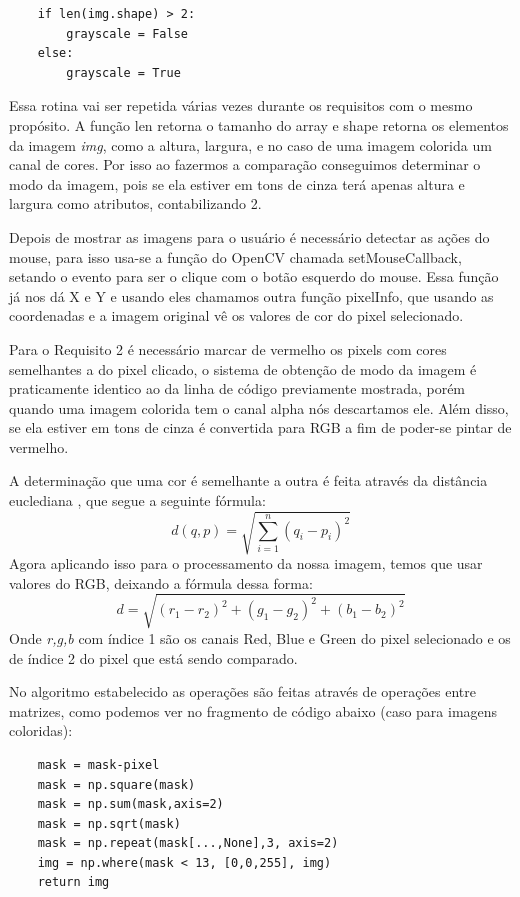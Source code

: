 \documentclass{bmvc2k}
\begin{document}
\begin{verbatim}
    if len(img.shape) > 2:
        grayscale = False
    else:
        grayscale = True
\end{verbatim}

Essa rotina vai ser repetida várias vezes durante os requisitos com o mesmo 
propósito. A função len retorna o tamanho do array e shape retorna os 
elementos da imagem {\em img}, como a altura, largura, e no caso de uma imagem colorida
um canal de cores. Por isso ao fazermos a comparação conseguimos determinar o modo da 
imagem, pois se ela estiver em tons de cinza terá apenas altura e largura como atributos, 
contabilizando 2.

\pagebreak

Depois de mostrar as imagens para o usuário é necessário detectar as ações do mouse, para isso
usa-se a função do OpenCV chamada setMouseCallback, setando o evento para ser o clique com o botão
esquerdo do mouse. Essa função já nos dá X e Y e usando eles chamamos outra função pixelInfo, que 
usando as coordenadas e a imagem original vê os valores de cor do pixel selecionado.

Para o Requisito 2 é necessário marcar de vermelho os pixels com cores semelhantes a do pixel clicado,
o sistema de obtenção de modo da imagem é praticamente identico ao da linha de código previamente mostrada,
porém quando uma imagem colorida tem o canal alpha nós descartamos ele. Além disso, se ela estiver em tons
de cinza é convertida para RGB a fim de poder-se pintar de vermelho.

A determinação que uma cor é semelhante a outra é feita através da distância euclediana \cite{Pbarrett}, que segue a
seguinte fórmula:
\begin{equation}
    d(q,p) = \sqrt{\sum_{i=1}^{n}(q_i - p_i)^2}
\end{equation}
Agora aplicando isso para o processamento da nossa imagem, temos que usar valores do RGB, deixando a fórmula
dessa forma:
\begin{equation}
    d = \sqrt{(r_1 - r_2)^2+(g_1 - g_2)^2+(b_1 - b_2)^2}
\end{equation}
Onde {\em r,g,b} com índice 1 são os canais Red, Blue e Green do pixel selecionado e os de índice 2 
do pixel que está sendo comparado.

No algoritmo estabelecido as operações são feitas através de operações entre 
matrizes, como podemos ver no fragmento de código abaixo (caso para imagens coloridas):
\begin{verbatim}
    mask = mask-pixel
    mask = np.square(mask)
    mask = np.sum(mask,axis=2)
    mask = np.sqrt(mask)
    mask = np.repeat(mask[...,None],3, axis=2)
    img = np.where(mask < 13, [0,0,255], img)
    return img
\end{verbatim}
\end{document}
